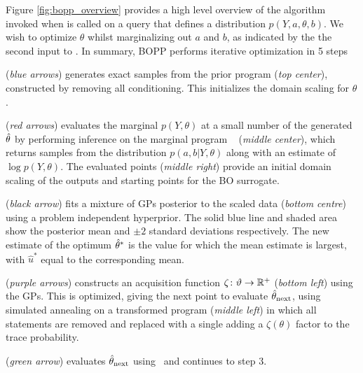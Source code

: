 Figure \ref{fig:bopp_overview} provides a high level overview of the algorithm invoked when \doopt is called on a query  that defines a distribution $p\left(Y, a, \theta , b\right)$.  We wish to optimize $\theta$ whilst marginalizing out $a$ and $b$, as indicated by the the second input to . In summary, BOPP performs iterative optimization in 5 steps
\begin{description}[align=left]
	\setlength\itemsep{-0.1em}
	\item[Step 1] (\emph{blue arrows}) generates exact samples from the prior program  (\emph{top center}), constructed by removing all conditioning. This initializes the domain scaling for $\theta$.
	\item[Step 2] (\emph{red arrows}) evaluates the marginal $p(Y,\theta)$ at a small number of the generated $\hat{\theta}$ by performing inference on the marginal program \qmarg~ (\emph{middle center}), which returns samples from the distribution $p\left(a,b | Y, \theta\right)$ along with an estimate of $\log p(Y, \theta)$.  The evaluated points (\emph{middle right}) provide an initial domain scaling of the outputs and starting points for the BO surrogate.
	\item[Step 3] (\emph{black arrow}) fits a mixture of GPs posterior
	to the scaled data (\emph{bottom centre}) using a problem independent hyperprior. The solid blue line and shaded area show the posterior mean and $\pm2$ standard deviations respectively. The new estimate of the optimum $\hat{\theta}^*$ is the value for which the mean estimate is largest, with $\hat{u}^*$ equal to the corresponding mean.    
	\item[Step 4] (\emph{purple arrows}) constructs an acquisition function $\zeta \colon \vartheta \rightarrow \mathbb{R}^+$ (\emph{bottom left}) using the GPs.  This is optimized, giving the next point to evaluate $\hat{\theta}_{\mathrm{next}}$, using simulated annealing on a transformed program  (\emph{middle left}) in which all \observe statements are removed and replaced with a single \observe adding a $\zeta(\theta)$ factor to the trace probability. %
	\item[Step 5] (\emph{green arrow}) evaluates $\hat{\theta}_{\mathrm{next}}$ using \qmarg~and continues to step 3.
\end{description}

